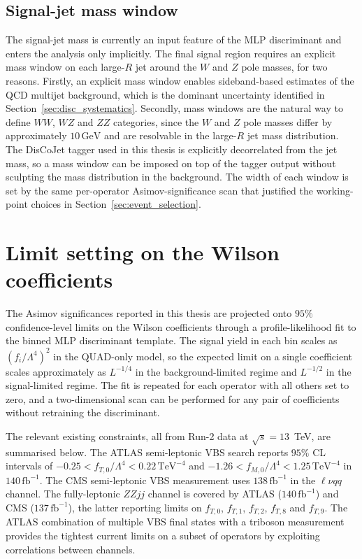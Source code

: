 \subsection{Signal-jet mass window}
\label{sec:outlook_masswindow}

The signal-jet mass is currently an input feature of the MLP discriminant and enters the analysis only implicitly. The final signal region requires an explicit mass window on each large-$R$ jet around the $W$ and $Z$ pole masses, for two reasons. Firstly, an explicit mass window enables sideband-based estimates of the QCD multijet background, which is the dominant uncertainty identified in Section~\ref{sec:disc_systematics}. Secondly, mass windows are the natural way to define $WW$, $WZ$ and $ZZ$ categories, since the $W$ and $Z$ pole masses differ by approximately $10\,\mathrm{GeV}$ and are resolvable in the large-$R$ jet mass distribution. The DisCoJet tagger used in this thesis is explicitly decorrelated from the jet mass, so a mass window can be imposed on top of the tagger output without sculpting the mass distribution in the background. The width of each window is set by the same per-operator Asimov-significance scan that justified the working-point choices in Section~\ref{sec:event_selection}.

\section{Limit setting on the Wilson coefficients}
\label{sec:outlook_limits}

The Asimov significances reported in this thesis are projected onto $95\%$ confidence-level limits on the Wilson coefficients through a profile-likelihood fit to the binned MLP discriminant template. The signal yield in each bin scales as $(f_i/\Lambda^4)^2$ in the QUAD-only model, so the expected limit on a single coefficient scales approximately as $L^{-1/4}$ in the background-limited regime and $L^{-1/2}$ in the signal-limited regime. The fit is repeated for each operator with all others set to zero, and a two-dimensional scan can be performed for any pair of coefficients without retraining the discriminant.

The relevant existing constraints, all from Run-2 data at $\sqrt{s}=13$~TeV, are summarised below. The ATLAS semi-leptonic VBS search \cite{ATLAS:semileptonicVBS:2025} reports $95\%$ CL intervals of $-0.25 < f_{T,0}/\Lambda^4 < 0.22\,\mathrm{TeV}^{-4}$ and $-1.26 < f_{M,0}/\Lambda^4 < 1.25\,\mathrm{TeV}^{-4}$ in $140\,\mathrm{fb}^{-1}$. The CMS semi-leptonic VBS measurement \cite{CMS:semileptonicVBS:2022} uses $138\,\mathrm{fb}^{-1}$ in the $\ell\nu qq$ channel. The fully-leptonic $ZZjj$ channel is covered by ATLAS \cite{ATLAS:fullyleptonicVBS:2024} ($140\,\mathrm{fb}^{-1}$) and CMS \cite{CMS:fullyleptonicZZjj:2021} ($137\,\mathrm{fb}^{-1}$), the latter reporting limits on $f_{T,0}$, $f_{T,1}$, $f_{T,2}$, $f_{T,8}$ and $f_{T,9}$. The ATLAS combination of multiple VBS final states with a triboson measurement \cite{ATLAS:VBStribosoncombination:2026} provides the tightest current limits on a subset of operators by exploiting correlations between channels.

